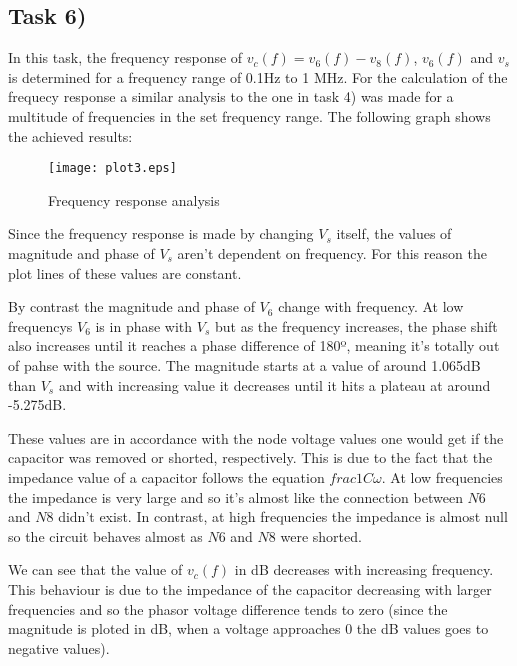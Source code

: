 \subsection{Task 6)}
\label{subsec:task6_a}

In this task, the frequency response of $v_c(f)= v_6(f) - v_8(f)$, $v_6(f)$ and $v_s$ is determined for a frequency range of 0.1Hz to 1 MHz. For the calculation of the frequecy response a similar analysis to the one in task 4) was made for a multitude of frequencies in the set frequency range. The following graph shows the achieved results: 


\begin{figure}[H]
	\centering
	\texttt{[image: plot3.eps]}
	\caption{Frequency response analysis}
\label{fig:Dsnh_sim_t2}
\end{figure}

Since the frequency response is made by changing $V_s$ itself, the values of magnitude and phase of $V_s$ aren't dependent on frequency. For this reason the plot lines of these values are constant.

By contrast the magnitude and phase of $V_6$ change with frequency. At low frequencys $V_6$ is in phase with $V_s$ but as the frequency increases, the phase shift also increases until it reaches a phase difference of 180º, meaning it's totally out of pahse with the source. The magnitude starts at a value of around 1.065dB than $V_s$ and with increasing value it decreases until it hits a plateau at around -5.275dB. 

These values are in accordance with the node voltage values one would get if the capacitor was removed or shorted, respectively. This is due to the fact that the impedance value of a capacitor follows the equation $frac{1}{C\omega}$. At low frequencies the impedance is very large and so it's almost like the connection between $N6$ and $N8$ didn't exist. In contrast, at high frequencies the impedance is almost null so the circuit behaves almost as $N6$ and $N8$ were shorted.

We can see that the value of $v_c(f)$ in dB decreases with increasing frequency. This behaviour is due to the impedance of the capacitor decreasing with larger frequencies and so the phasor voltage difference tends to zero (since the magnitude is ploted in dB, when a voltage approaches 0 the dB values goes to negative values).









